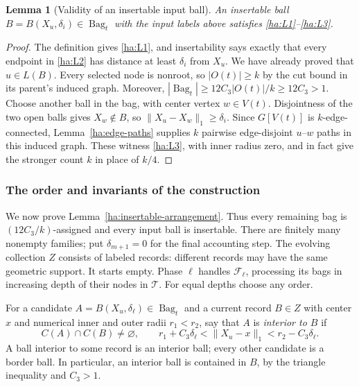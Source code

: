 \documentclass[11pt]{amsart}
\newtheorem{lemma}[theorem]{Lemma}
\theoremstyle{definition}
\theoremstyle{remark}
\numberwithin{equation}{section}
\begin{document}
\begin{lemma}[Validity of an insertable input ball]\label{ha:input-valid}
An insertable ball $B=B(X_u,\delta_i)\in\operatorname{Bag}_t$
with the input labels above satisfies \ref{ha:L1}--\ref{ha:L3}.
\end{lemma}
\begin{proof}
The definition gives \ref{ha:L1}, and insertability says exactly that
every endpoint in \ref{ha:L2} has distance at least $\delta_i$ from
$X_u$.  We have already proved that $u\in L(B)$.
Every selected node is nonroot, so $|O(t)|\ge k$ by the cut bound
in its parent's induced graph.  Moreover,
$|\operatorname{Bag}_t|\ge12C_3|O(t)|/k\ge12C_3>1$.
Choose another ball in the bag, with center vertex $w\in V(t)$.
Disjointness of the two open balls gives $X_w\notin B$, so
$\|X_u-X_w\|_1\ge\delta_i$.  Since $G[V(t)]$ is
$k$-edge-connected, Lemma~\ref{ha:edge-paths} supplies
$k$ pairwise edge-disjoint $u$--$w$ paths in this induced graph.
These witness \ref{ha:L3}, with inner radius zero, and in fact give
the stronger count $k$ in place of $k/4$.
\end{proof}

\subsubsection{The order and invariants of the construction}
\label{ha:order}

We now prove Lemma~\ref{ha:insertable-arrangement}.  Thus every remaining
bag is $(12C_3/k)$-assigned and every input ball is insertable.  There
are finitely many nonempty families; put $\delta_{m+1}=0$ for the final
accounting step.  The evolving collection $Z$ consists of labeled
records: different records may have the same geometric support.
It starts empty.  Phase $\ell$ handles $\mathcal F_\ell$, processing
its bags in increasing depth of their nodes in $\mathcal T$.
For equal depths choose any order.

For a candidate $A=B(X_u,\delta_\ell)\in\operatorname{Bag}_t$ and
a current record $B\in Z$ with center $x$ and numerical inner and
outer radii $r_1<r_2$, say that $A$ is
\emph{interior to $B$} if
\begin{equation}\label{ha:interior}
 C(A)\cap C(B)\ne\varnothing,\qquad
 r_1+C_3\delta_\ell<\|X_u-x\|_1<r_2-C_3\delta_\ell.
\end{equation}
A ball interior to some record is an interior ball; every other
candidate is a border ball.  In particular, an interior ball is
contained in $B$, by the triangle inequality and $C_3>1$.
\end{document}

